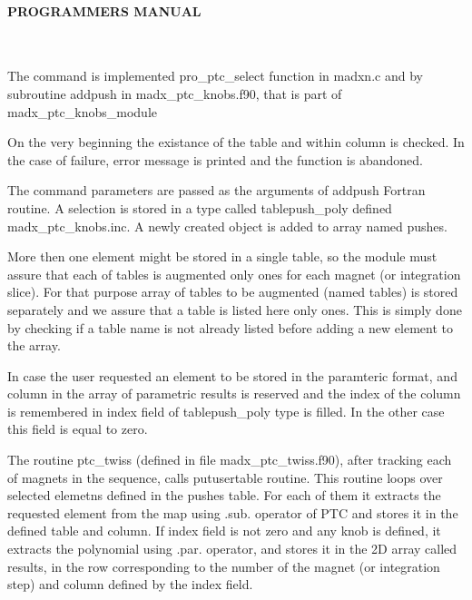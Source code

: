 


\paragraph{ PROGRAMMERS MANUAL } 
  \textbf{ \\} %

  The command is implemented pro\_ptc\_select function in madxn.c and  by subroutine addpush in madx\_ptc\_knobs.f90, that is part of madx\_ptc\_knobs\_module  

 On the very beginning the existance of the table and within column is checked. In the case of failure, error message is printed and the function is abandoned.  

 The command parameters are passed as the arguments of addpush Fortran routine.  A selection is stored in a type called tablepush\_poly defined madx\_ptc\_knobs.inc. A newly created object is added to array named pushes.   

 More then one element might be stored in a single table, so the module must assure that  each of tables is augmented only ones for each magnet (or integration slice).  For that purpose array of tables to be augmented (named tables) is stored separately and  we assure that a table is listed here only ones. This is simply done by checking  if a table name is not already listed before adding a new element to the array.  

 In case the user requested an element to be stored in the paramteric format, and column in the array of parametric results is reserved and the index of the column is remembered in index field of tablepush\_poly type is filled. In the other case this field is equal to zero.  

 The routine ptc\_twiss (defined in file madx\_ptc\_twiss.f90), after tracking each of magnets  in the sequence, calls putusertable routine. This routine loops over selected elemetns defined in the pushes table. For each of them it extracts the requested element from the map using .sub.  operator of PTC and stores it in the defined table and column.  If index field is not zero and any knob is defined, it extracts the polynomial using .par. operator, and stores it in the 2D array called results, in the row corresponding to the number of the magnet (or integration step) and column defined by the index field.    

